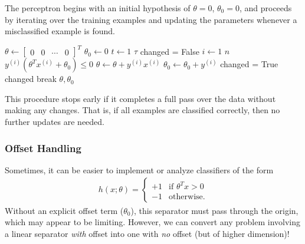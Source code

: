 \documentclass[11pt]{article}
\newcommand\ex[2]{#1^{(#2)}}
\newcommand\dataTrain{{\cal D}_n}
\begin{document}
The perceptron begins with an initial hypothesis of $\theta = 0$, $\theta_0 = 0$, and proceeds by iterating over the training examples and updating the parameters whenever a misclassified example is found.

\begin{codebox}
  \Procname{$\proc{Perceptron}(\tau, \dataTrain)$}
  \li $\theta \gets 
    \begin{bmatrix}
      0 & 0 & \cdots & 0
    \end{bmatrix}^T$
  \li $\theta_0 \gets 0$
  \li \For $t \gets 1$ \To $\tau$
  \li   \Do
            changed = False
  \li        \For $i \gets 1$ \To $n$
  \li       \Do
              \If $\ex{y}{i}\left(\theta^T\ex{x}{i} + \theta_0\right) \le 0$
  \li           \Then
                  $\theta \gets \theta + \ex{y}{i}\ex{x}{i}$
  \li             $\theta_0 \gets \theta_0 + \ex{y}{i}$
  \li             changed = True
                \End
            \End
  \li      {} changed
  \li          \Then
		  break
      \End
      \End
  \li \Return $\theta, \theta_0$
\end{codebox}

This procedure stops early if it completes a full pass over the data without making any changes. That is, if all examples are classified correctly, then no further updates are needed.

\subsubsection*{Offset Handling}

Sometimes, it can be easier to implement or analyze classifiers of the
form 
\begin{eqnarray*}
  h(x; \theta) =
  \begin{cases}
    +1 & \text{if } \theta^Tx > 0 \\
    -1 & \text{otherwise.}
  \end{cases}
  \end{eqnarray*}
  Without an explicit offset term ($\theta_0$), this separator must pass
through the origin, which may appear to be limiting. However, we can
convert any problem involving a linear separator \emph{with} offset
into one with \emph{no} offset (but of higher dimension)!
\end{document}

